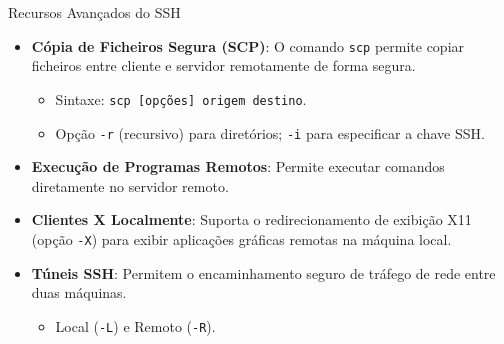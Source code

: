 \documentclass{beamer}
\begin{document}
	\begin{frame}{Recursos Avançados do SSH}
		\begin{itemize}
			\item \textbf{Cópia de Ficheiros Segura (SCP)}: O comando \texttt{scp} permite copiar ficheiros entre cliente e servidor remotamente de forma segura.
			\begin{itemize}
				\item Sintaxe: \texttt{scp [opções] origem destino}.
				\item Opção \texttt{-r} (recursivo) para diretórios; \texttt{-i} para especificar a chave SSH.
			\end{itemize}
			\item \textbf{Execução de Programas Remotos}: Permite executar comandos diretamente no servidor remoto.
			\item \textbf{Clientes X Localmente}: Suporta o redirecionamento de exibição X11 (opção \texttt{-X}) para exibir aplicações gráficas remotas na máquina local.
			\item \textbf{Túneis SSH}: Permitem o encaminhamento seguro de tráfego de rede entre duas máquinas.
			\begin{itemize}
				\item Local (\texttt{-L}) e Remoto (\texttt{-R}).
			\end{itemize}
		\end{itemize}
	\end{frame}
	
\end{document}
